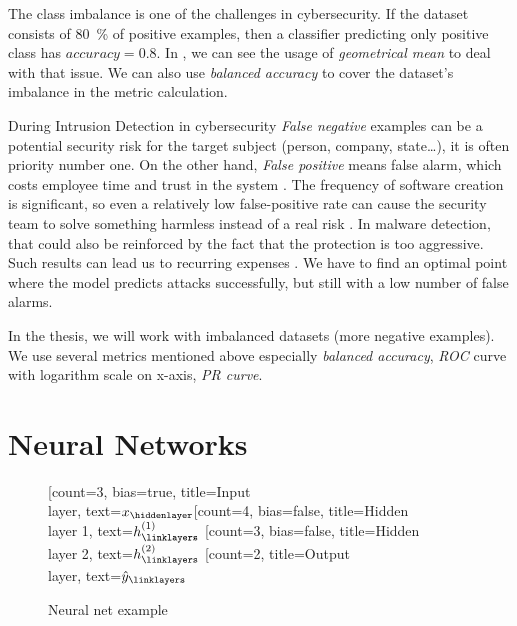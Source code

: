 The class imbalance is one of the challenges in cybersecurity. If the dataset consists of 80~\% of positive examples, then a classifier predicting only positive class has $accuracy=0.8$. In \cite{Hernandez-Callejo2019}, we can see the usage of \emph{geometrical mean} to deal with that issue. We can also use \emph{balanced accuracy} to cover the dataset's imbalance in the metric calculation.

During Intrusion Detection in cybersecurity \emph{False negative} examples can be a potential security risk for the target subject (person, company, state\dots), it is often priority number one. On the other hand,  \emph{False positive} means false alarm, which costs employee time and trust in the system \cite{owaspintrusion}. The frequency of software creation is significant, so even a relatively low false-positive rate can cause the security team to solve something harmless instead of a real risk \cite{Apruzzese2018}. In malware detection, that could also be reinforced by the fact that the protection is too aggressive. Such results can lead us to recurring expenses \cite{Kubovic2017}. We have to find an optimal point where the model predicts attacks successfully, but still with a low number of false alarms.

In the thesis, we will work with imbalanced datasets (more negative examples). We use several metrics mentioned above especially \emph{balanced accuracy}, \emph{ROC} curve with logarithm scale on x-axis, \emph{PR curve}.

\section{Neural Networks}
\begin{figure}
    \centering
    \begin{neuralnetwork}[height=4]
        \newcommand{\x}[2]{$x_#2$}
        \newcommand{\y}[2]{$\hat{y}_#2$}
        \newcommand{\hfirst}[2]{\small $h^{(1)}_#2$}
        \newcommand{\hsecond}[2]{\small $h^{(2)}_#2$}
        [count=3, bias=true, title=Input\\layer, text=\x]
        \hiddenlayer[count=4, bias=false, title=Hidden\\layer 1, text=\hfirst] \linklayers
        \hiddenlayer[count=3, bias=false, title=Hidden\\layer 2, text=\hsecond] \linklayers
        \outputlayer[count=2, title=Output\\layer, text=\y] \linklayers
    \end{neuralnetwork}
    \caption{Neural net example}
    \label{fig:neuralnet}
\end{figure}


